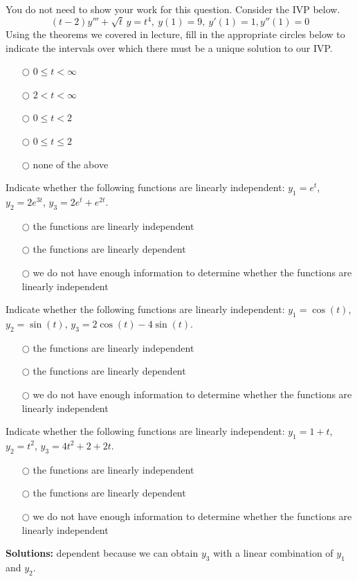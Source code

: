 \ifnum {}    
\question[1] You do not need to show your work for this question. Consider the IVP below.
$$\displaystyle (t-2)y''' + \sqrt{t}\,y = t^4, \ y(1) = 9, \ y'(1)=1, y''(1) = 0$$   
Using the theorems we covered in lecture, fill in the appropriate circles below to indicate the intervals over which there must be a unique solution to our IVP.
\begin{itemize}
    \item[$\bigcirc$] $0 \le t < \infty$
    \item[$\bigcirc$] $2 < t < \infty$
    \item[$\bigcirc$] $0 \le t < 2$
    \item[$\bigcirc$] $0 \le t \le 2$
    \item[$\bigcirc$] none of the above
\end{itemize}
\fi

\ifnum {}
\question[1] Indicate whether the following functions are linearly independent: $y_1 = e^t$, $y_2 = 2e^{3t}$, $y_3 = 2e^t + e^{2t}$. 
\begin{itemize}
    \item[$\bigcirc$] the functions are linearly independent
    \item[$\bigcirc$] the functions are linearly dependent
    \item[$\bigcirc$] we do not have enough information to determine whether the functions are linearly independent    
\end{itemize}
\fi

\ifnum {}
\question[1] Indicate whether the following functions are linearly independent: $y_1 = \cos(t)$, $y_2 = \sin(t)$, $y_3 = 2\cos(t) - 4 \sin(t)$. 
\begin{itemize}
    \item[$\bigcirc$] the functions are linearly independent
    \item[$\bigcirc$] the functions are linearly dependent
    \item[$\bigcirc$] we do not have enough information to determine whether the functions are linearly independent    
\end{itemize}
\fi

\ifnum {}
\question[1] Indicate whether the following functions are linearly independent: $y_1 = 1+t$, $y_2 = t^2$, $y_3 = 4t^2 + 2+2t$. 
\begin{itemize}
    \item[$\bigcirc$] the functions are linearly independent
    \item[$\bigcirc$] the functions are linearly dependent
    \item[$\bigcirc$] we do not have enough information to determine whether the functions are linearly independent    
\end{itemize}
\ifnum {} {\color{DarkBlue} 
\textbf{Solutions:} dependent because we can obtain $y_3$ with a linear combination of $y_1$ and $y_2$.
} 
\else 
\fi
\fi

